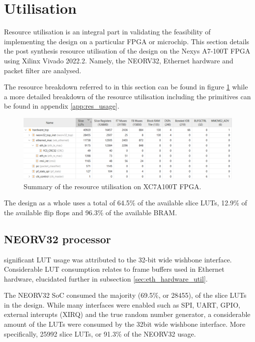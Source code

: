 \section{Utilisation}

Resource utilisation is an integral part in validating the feasibility of implementing the design on a particular FPGA or microchip. This section details the post synthesis resource utilisation of the design on the Nexys A7-100T FPGA using Xilinx Vivado 2022.2. Namely, the NEORV32, Ethernet hardware and packet filter are analysed.


The resource breakdown referred to in this section can be found in figure \ref{fig:resource_util} while a more detailed breakdown of the resource utilisation including the primitives can be found in appendix \ref{app:res_usage}. 

\begin{figure}[h]
    \centering
    \includegraphics[width=1\textwidth]{Images/FPGAUtilisationResources.png}
    \caption[Summary of the resource utilisation on XC7A100T FPGA]{Summary of the resource utilisation on XC7A100T FPGA.}
    \label{fig:resource_util}
\end{figure}

 
The design as a whole uses a total of 64.5\% of the available slice LUTs, 12.9\% of the available flip flops and 96.3\% of the available BRAM.




\subsection{NEORV32 processor}

significant LUT usage was attributed to the 32-bit wide wishbone interface. Considerable LUT consumption relates to frame buffers used in Ethernet hardware, elucidated further in subsection \ref{sec:eth_hardware_util}.


The NEORV32 SoC consumed the majority (69.5\%, or 28455), of the slice LUTs in the design. While many interfaces were enabled such as SPI, UART, GPIO, external interupts (XIRQ) and the true random number generator, a considerable amount of the LUTs were consumed by the 32bit wide wishbone interface. More specifically, 25992 slice LUTs, or 91.3\% of the NEORV32 usage. 

